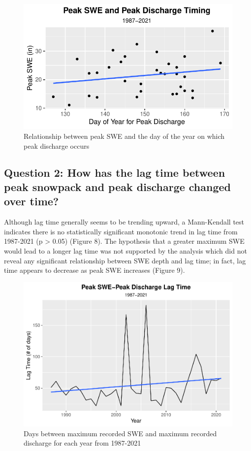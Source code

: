 \documentclass[
  12pt,
]{article}
\begin{document}
\begin{figure}
\centering
\includegraphics{McLaughlin_WDA_Project_files/figure-latex/unnamed-chunk-6-1.pdf}
\caption{Relationship between peak SWE and the day of the year on which
peak discharge occurs}
\end{figure}

\newpage

\hypertarget{question-2-how-has-the-lag-time-between-peak-snowpack-and-peak-discharge-changed-over-time}{%
\subsection{Question 2: How has the lag time between peak snowpack and
peak discharge changed over
time?}\label{question-2-how-has-the-lag-time-between-peak-snowpack-and-peak-discharge-changed-over-time}}

Although lag time generally seems to be trending upward, a Mann-Kendall
test indicates there is no statistically significant monotonic trend in
lag time from 1987-2021 (p \textgreater{} 0.05) (Figure 8). The
hypothesis that a greater maximum SWE would lead to a longer lag time
was not supported by the analysis which did not reveal any significant
relationship between SWE depth and lag time; in fact, lag time appears
to decrease as peak SWE increases (Figure 9).

\begin{figure}
\centering
\includegraphics{McLaughlin_WDA_Project_files/figure-latex/unnamed-chunk-7-1.pdf}
\caption{Days between maximum recorded SWE and maximum recorded
discharge for each year from 1987-2021}
\end{figure}
\end{document}
